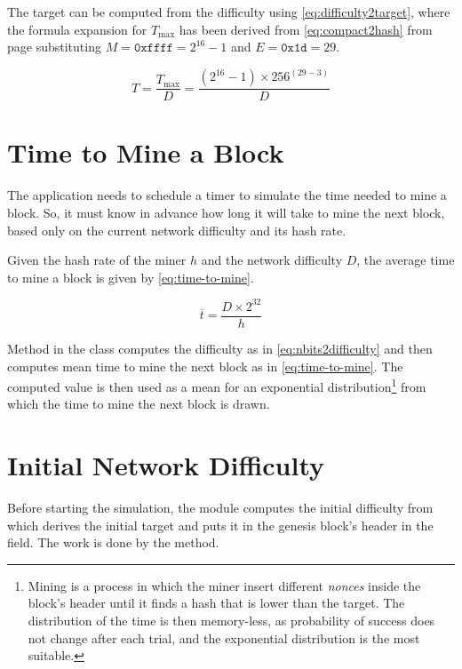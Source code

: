 The target can be computed from the difficulty using
\eqref{eq:difficulty2target}, where the formula expansion for
\(T_{\text{max}}\) has been derived from \eqref{eq:compact2hash} from page
\pageref{eq:compact2hash} substituting \(M = \texttt{0xffff} = 2^{16} - 1\) and
\(E = \texttt{0x1d} = 29\).

\begin{equation}\label{eq:difficulty2target}
	T = \frac{T_{\text{max}}}{D} = \frac{(2^{16} - 1) \times 256^{(29 -
	3)}}{D}
\end{equation}

\section{Time to Mine a Block}\label{appendix:time-to-mine}

The  application needs to schedule a timer to simulate the time
needed to mine a block. So, it must know in advance how long it will take to
mine the next block, based only on the current network difficulty and its hash
rate.

Given the hash rate of the miner \(h\) and the network difficulty \(D\), the
average time to mine a block is given by \eqref{eq:time-to-mine}.

\begin{equation}\label{eq:time-to-mine}
	\overline{t} = \frac{D \times 2^{32}}{h}
\end{equation}

Method  in the  class computes the
difficulty as in \eqref{eq:nbits2difficulty} and then computes mean time to
mine the next block as in \eqref{eq:time-to-mine}. The computed value is then
used as a mean for an exponential distribution\footnote{Mining is a process in
which the miner insert different \emph{nonces} inside the block's header until
it finds a hash that is lower than the target. The distribution of the time is
then memory-less, as probability of success does not change after each trial,
and the exponential distribution is the most suitable.} from which the time to
mine the next block is drawn.

\section{Initial Network Difficulty}\label{appendix:initial-difficulty}

Before starting the simulation, the  module computes the initial
difficulty from which derives the initial target and puts it in the genesis
block's header in the  field. The work is done by the
 method.

